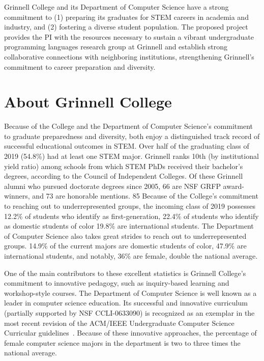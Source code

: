 \documentclass[11pt]{article}
\begin{document}
\smalltitle{}

Grinnell College and its Department of Computer Science have a strong commitment to (1) preparing its graduates for STEM careers in academia and industry, and (2) fostering a diverse student population.
The proposed project provides the PI with the resources necessary to sustain a vibrant undergraduate programming languages research group at Grinnell and establish strong collaborative connections with neighboring institutions, strengthening Grinnell's commitment to career preparation and diversity.
\vspace{2ex}
\section{About Grinnell College}

Because of the College and the Department of Computer Science's commitment to graduate preparedness and diversity, both enjoy a distinguished track record of successful educational outcomes in STEM.
Over half of the graduating class of 2019 (54.8\%) had at least one STEM major.
Grinnell ranks 10th (by institutional yield ratio) among schools from which STEM PhDs received their bachelor's degrees, according to the Council of Independent Colleges.
Of these Grinnell alumni who pursued doctorate degrees since 2005, 66 are NSF GRFP award-winners, and 73 are honorable mentions.
85%
Because of the College's commitment to reaching out to underrepresented groups, the incoming class of 2019 possesses 12.2\% of students who identify as first-generation, 22.4\% of students who identify as domestic students of color 19.8\% are international students.
The Department of Computer Science also takes great strides to reach out to underrepresented groups.
14.9\% of the current majors are domestic students of color, 47.9\% are international students, and notably, 36\% are female, double the national average.

One of the main contributors to these excellent statistics is Grinnell College's commitment to innovative pedagogy, such as inquiry-based learning and workshop-style courses.
The Department of Computer Science is well known as a leader in computer science education.
Its successful and innovative curriculum~\cite{cowden:sigcse:2012, rebelsky:sigcse:2013} (partially supported by NSF CCLI-0633090) is recognized as an exemplar in the most recent revision of the ACM/IEEE Undergraduate Computer Science Curricular guidelines~\cite{acm:curriculum:2013}.
Because of these innovative approaches, the percentage of female computer science majors in the department is two to three times the national average.
\end{document}
